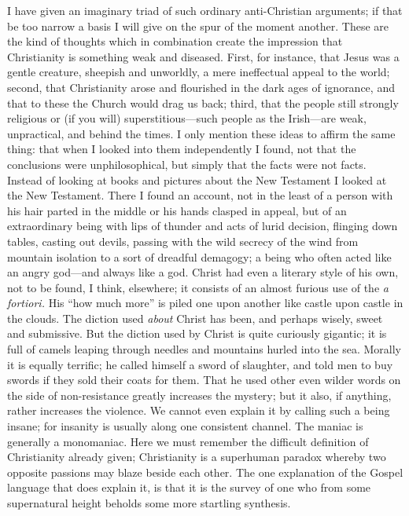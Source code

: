 \documentclass{book}
\begin{document}
I have given an imaginary triad of such ordinary anti-Christian arguments; if that be too narrow a basis I will give on the spur of the moment another. These are the kind of thoughts which in combination create the impression that Christianity is something weak and diseased. First, for instance, that Jesus was a gentle creature, sheepish and unworldly, a mere ineffectual appeal to the world; second, that Christianity arose and flourished in the dark ages of ignorance, and that to these the Church would drag us back; third, that the people still strongly religious or (if you will) superstitious—such people as the Irish—are weak, unpractical, and behind the times. I only mention these ideas to affirm the same thing: that when I looked into them independently I found, not that the conclusions were unphilosophical, but simply that the facts were not facts. Instead of looking at books and pictures about the New Testament I looked at the New Testament. There I found an account, not in the least of a person with his hair parted in the middle or his hands clasped in appeal, but of an extraordinary being with lips of thunder and acts of lurid decision, flinging down tables, casting out devils, passing with the wild secrecy of the wind from mountain isolation to a sort of dreadful demagogy; a being who often acted like an angry god—and always like a god. Christ had even a literary style of his own, not to be found, I think, elsewhere; it consists of an almost furious use of the \emph{a fortiori.} His “how much more” is piled one upon another like castle upon castle in the clouds. The diction used \emph{about} Christ has been, and perhaps wisely, sweet and submissive. But the diction used by Christ is quite curiously gigantic; it is full of camels leaping through needles and mountains hurled into the sea. Morally it is equally terrific; he called himself a sword of slaughter, and told men to buy swords if they sold their coats for them. That he used other even wilder words on the side of non-resistance greatly increases the mystery; but it also, if anything, rather increases the violence. We cannot even explain it by calling such a being insane; for insanity is usually along one consistent channel. The maniac is generally a monomaniac. Here we must remember the difficult definition of Christianity already given; Christianity is a superhuman paradox whereby two opposite passions may blaze beside each other. The one explanation of the Gospel language that does explain it, is that it is the survey of one who from some supernatural height beholds some more startling synthesis.
\end{document}
